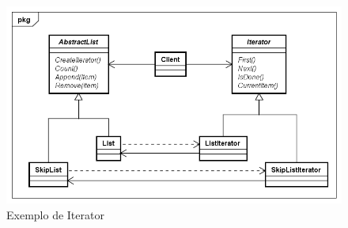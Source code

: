 \begin{figure}[htb]
	\caption{\label{iterator_exemplo}Exemplo de Iterator}
	\begin{center}
	    \includegraphics[scale=0.5]{5_padroes-contexto-funcional/5.3_comportamentais/5.3.04_iterator/iterator_exemplo.png}
	\end{center}
\end{figure}

